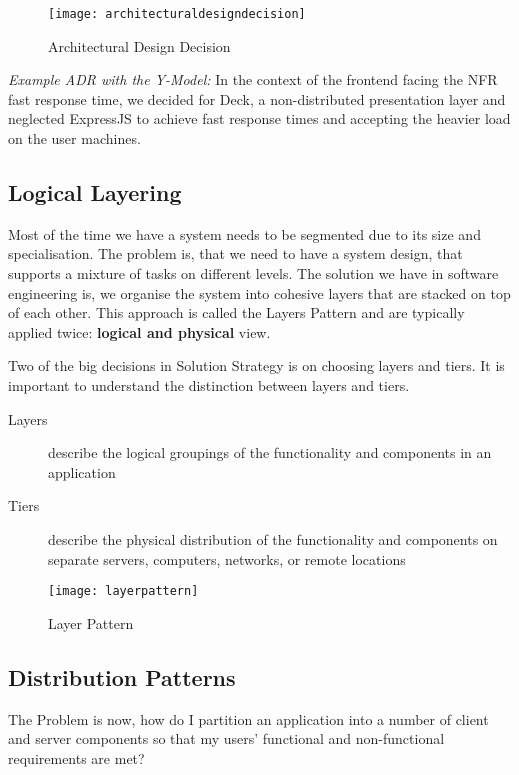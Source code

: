 \begin{figure}[H]
  \center
  \texttt{[image: architecturaldesigndecision]}
  \caption{Architectural Design Decision}
  \label{fig:ymodel}
\end{figure}

\textit{Example ADR with the Y-Model:} 
In the context of the frontend facing the NFR fast response time, we decided for Deck, a non-distributed presentation layer and neglected ExpressJS to achieve fast response times and accepting the heavier load on the user machines.


\subsection{Logical Layering}
Most of the time we have a system needs to be segmented due to its size and specialisation. The problem is, that we need to have a system design, that supports a mixture of tasks on different levels. The solution we have in software engineering is, we organise the system into cohesive layers that are stacked on top of each other. This approach is called the Layers Pattern and are typically applied twice: \textbf{logical and physical} view.

Two of the big decisions in Solution Strategy is on choosing layers and tiers. It is important to understand the distinction between layers and tiers.

\begin{description}
	\item [Layers] describe the logical groupings of the functionality and components in an application
	\item [Tiers]  describe the physical distribution of the functionality and components on separate servers, computers, networks, or remote locations
\end{description}

\begin{figure}[h!]
  \center
  \texttt{[image: layerpattern]}
  \caption{Layer Pattern}
\end{figure}

\subsection{Distribution Patterns}
The Problem is now, how do I partition an application into a number of client and server components so that my users' functional and non-functional requirements are met?

